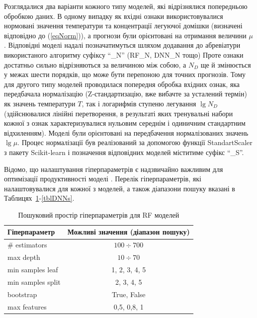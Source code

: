 \documentclass[12pt,a4paper,titlepage,oneside]{book}
\numberwithin{equation}{part}
\begin{document}
Розглядалися два варіанти кожного типу моделей, які відрізнялися попередньою обробкою даних.
В одному випадку як вхідні ознаки використовувалися нормовані значення температури та концентрації легуючої домішки
(визначені відповідно до (\ref{eqNorm})), а прогнози були орієнтовані на отримання величини $\mu$.
Відповідні моделі надалі позначатимуться шляхом додавання до абревіатури використаного алгоритму суфіксу ``\_N'' (RF\_N, DNN\_N тощо)
Проте ознаки достатньо сильно відрізняються за величиною між собою, а $N_D$ ще й змінюється у межах шести порядків,
що може бути перепоною для точних прогнозів.
Тому для другого типу моделей проводилася попередня обробка вхідних ознак, яка передбачала нормалізацію (Z-стандартизацію, вже вибачте за усталений термін)
як значень температури $T$,
так і логарифмів ступеню легування $\lg N_D$
(здійснювалися лінійні перетворення, в результаті яких тренувальні набори кожної з ознак характеризувалися нульовим середнім і одиничним стандартним відхиленням).
Моделі були орієнтовані на передбачення нормалізованих значень $\lg \mu$.
Процес нормалізації був реалізований за допомогою функції StandartScaler з пакету Scikit-learn і позначення відповідних моделей міститиме суфікс ``\_S''.

Відомо, що налаштування гіперпараметрів  є надзвичайно важливим для оптимізації продуктивності моделі \cite{Hanif2024}.
Перелік гіперпараметрів, які налаштовувалися для кожної з моделей, а також діапазони пошуку вказані в Таблицях~\ref{tblRFs}-\ref{tblDNNs}.


\begin{table}
\caption{Пошуковий простір гіперпараметрів для RF моделей }
\label{tblRFs}
\centering
\begin{tabular}{|l|c|}
\hline
Гіперпараметр&Можливі значення (діапазон пошуку)\\
\hline
\# estimators&	$100\div700$\\
\hline
max depth&	$10\div70$\\
\hline
min samples leaf &	1, 2, 3, 4, 5\\
\hline
min samples split	&2, 3, 4, 5\\
\hline
bootstrap	& True, False \\
\hline
max features &	0,5, 0,8, 1\\
\hline
\end{tabular}
\end{table}
\end{document}
